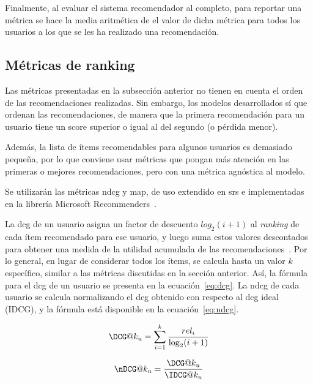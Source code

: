 Finalmente, al evaluar el sistema recomendador al completo, para reportar una métrica se hace la media aritmética de el valor de dicha métrica para todos los usuarios a los que se les ha realizado una recomendación.

\subsection{Métricas de ranking}
\newcommand\DCG{\text{DCG}}
\newcommand\nDCG{\text{nDCG}}
\newcommand\IDCG{\text{IDCG}}
\newcommand\AveP{\text{AveP}}
\newcommand\MAP{\text{MAP}}
\newcommand\rel{\text{rel}}

Las métricas presentadas en la subsección anterior no tienen en cuenta el orden de las recomendaciones realizadas. Sin embargo, los modelos desarrollados sí que ordenan las recomendaciones, de manera que la primera recomendación para un usuario tiene un score superior o igual al del segundo (o pérdida menor).

Además, la lista de ítems recomendables para algunos usuarios es demasiado pequeña, por lo que conviene usar métricas que pongan más atención en las primeras o mejores recomendaciones, pero con una métrica agnóstica al modelo.

Se utilizarán las métricas \gls{ndcg} y \gls{map}, de uso extendido en \glspl{sr} e implementadas en la librería Microsoft Recommenders~\cite{argyriou_microsoft_2020}.

La \acrfull{dcg} de un usuario asigna un factor de descuento $log_2(i+1)$ al \textit{ranking} de cada ítem recomendado para ese usuario, y luego suma estos valores descontados para obtener una medida de la utilidad acumulada de las recomendaciones~\cite{aggarwal_recommender_2016}. Por lo general, en lugar de considerar todos los ítems, se calcula hasta un valor $k$ específico, similar a las métricas discutidas en la sección anterior. Así, la fórmula para el \gls{dcg} de un usuario se presenta en la ecuación~\ref{eq:dcg}. La \acrfull{ndcg} de cada usuario se calcula normalizando el \gls{dcg} obtenido con respecto al \gls{dcg} ideal (IDCG), y la fórmula está disponible en la ecuación~\ref{eq:ndcg}.

\begin{minipage}{.5\textwidth}
    \begin{equation}\label{eq:dcg}
        \DCG@k_u = \sum_{i=1}^{k} \frac{rel_i}{\log_2 (i+1)}
    \end{equation}
\end{minipage}\begin{minipage}{.5\textwidth}
    \begin{equation}\label{eq:ndcg}
        \nDCG@k_u = \frac{\DCG@k_u}{\IDCG@k_u}
    \end{equation}
\end{minipage}

